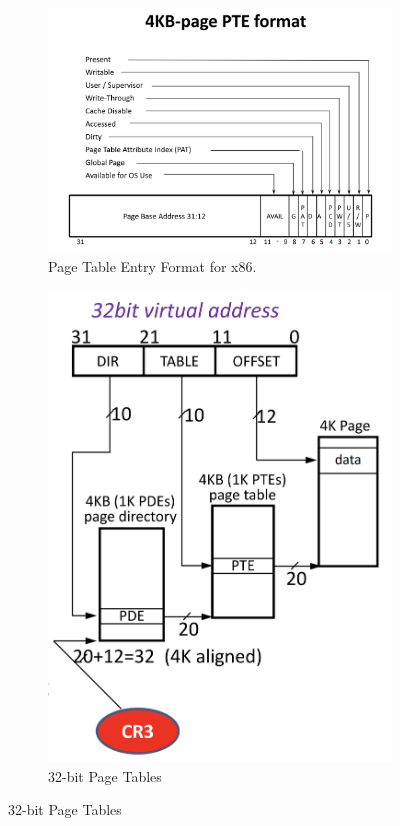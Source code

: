 \documentclass[openany,12pt]{book}
\begin{document}
\begin{figure}[H]
    \centering
    \begin{subfigure}[b]{0.6\textwidth}
        \centering
        \includegraphics[width=\textwidth]{PTE-format.png}
        \caption{Page Table Entry Format for x86.}
        \label{fig:PTE-format}
    \end{subfigure}
    \hfill %
    \begin{subfigure}[b]{0.3\textwidth}
        \centering
        \includegraphics[width=\textwidth]{32bit-virtual.png}
        \caption{32-bit Page Tables}
        \label{fig:32bit-virtual}
    \end{subfigure}
\end{figure}
\end{document}
